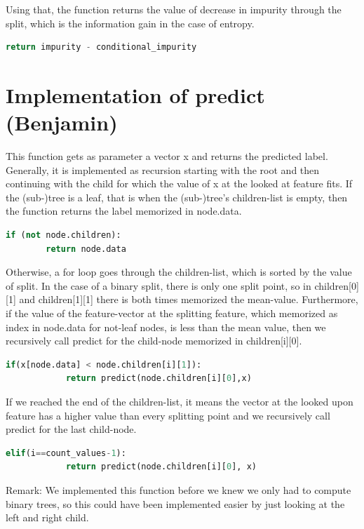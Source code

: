 \documentclass[12pt,a4paper]{scrartcl}		%
\begin{document}
Using that, the function returns the value of decrease in impurity through the split, which is the 
information gain in the case of entropy.
 
\begin{lstlisting}[language=Python]
    return impurity - conditional_impurity
\end{lstlisting}

\section{Implementation of predict (Benjamin)}
This function gets as parameter a vector x and returns the predicted label. Generally, it is implemented as 
recursion starting with the root and then continuing with the child for which the value of x at the looked 
at feature fits. 
If the (sub-)tree is a leaf, that is when the (sub-)tree’s children-list is empty, then the function returns 
the label memorized in node.data. 

\begin{lstlisting}[language=Python]
    if (not node.children):
        return node.data
\end{lstlisting}
 
Otherwise, a for loop goes through the children-list, which is sorted by the value of split. In the case of 
a binary split, there is only one split point, so in children[0][1] and children[1][1] there is both times 
memorized the mean-value. 
Furthermore, if the value of the feature-vector at the splitting feature, which memorized as index in node.data 
for not-leaf nodes, is less than the mean value, then we recursively call predict for the child-node memorized 
in children[i][0]. 

\begin{lstlisting}[language=Python]
    if(x[node.data] < node.children[i][1]):           
            return predict(node.children[i][0],x) 
\end{lstlisting}

If we reached the end of the children-list, it means the vector at the looked upon feature has a higher value 
than every splitting point and we recursively call predict for the last child-node. 

\begin{lstlisting}[language=Python]
    elif(i==count_values-1):                    
            return predict(node.children[i][0], x)
\end{lstlisting}

Remark: We implemented this function before we knew we only had to compute binary trees, so this could have 
been implemented easier by just looking at the left and right child.
\end{document}
